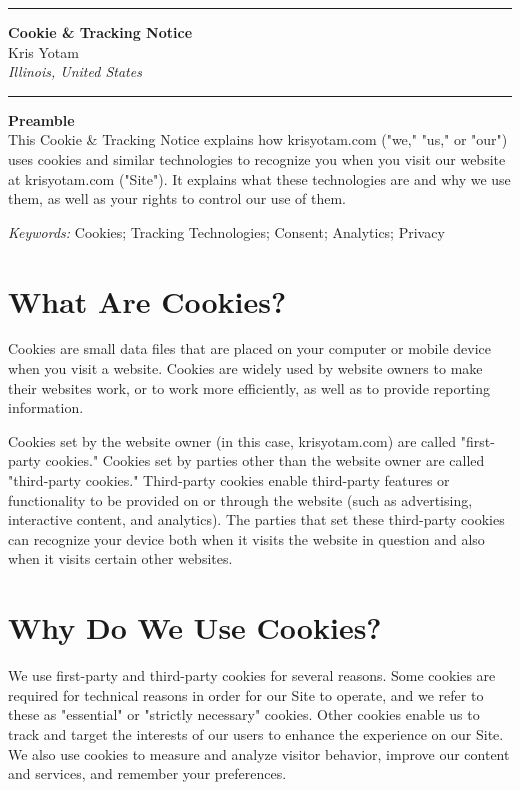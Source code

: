 \documentclass[11pt]{article}
\newcommand{\TitleLine}{\noindent\rule{\textwidth}{0.4pt}}
\begin{document}
\onehalfspacing

\vspace*{-1em}
\TitleLine
\vspace{0.5em}
\begin{center}
  {\Large\bfseries Cookie \& Tracking Notice}\\[0.75em]
  {\normalsize Kris Yotam}\\
  {\itshape Illinois, United States}
\end{center}
\vspace{0.5em}
\TitleLine

\vspace{1.5em}

\noindent\textbf{Preamble}\\
This Cookie \& Tracking Notice explains how krisyotam.com ("we," "us," or "our") uses cookies and similar technologies to recognize you when you visit our website at krisyotam.com ("Site"). It explains what these technologies are and why we use them, as well as your rights to control our use of them.

\vspace{0.75em}
\noindent\textit{Keywords:} Cookies; Tracking Technologies; Consent; Analytics; Privacy

\vspace{1.5em}

\section{What Are Cookies?}
Cookies are small data files that are placed on your computer or mobile device when you visit a website. Cookies are widely used by website owners to make their websites work, or to work more efficiently, as well as to provide reporting information.

Cookies set by the website owner (in this case, krisyotam.com) are called "first-party cookies." Cookies set by parties other than the website owner are called "third-party cookies." Third-party cookies enable third-party features or functionality to be provided on or through the website (such as advertising, interactive content, and analytics). The parties that set these third-party cookies can recognize your device both when it visits the website in question and also when it visits certain other websites.

\section{Why Do We Use Cookies?}
We use first-party and third-party cookies for several reasons. Some cookies are required for technical reasons in order for our Site to operate, and we refer to these as "essential" or "strictly necessary" cookies. Other cookies enable us to track and target the interests of our users to enhance the experience on our Site. We also use cookies to measure and analyze visitor behavior, improve our content and services, and remember your preferences.
\end{document}
